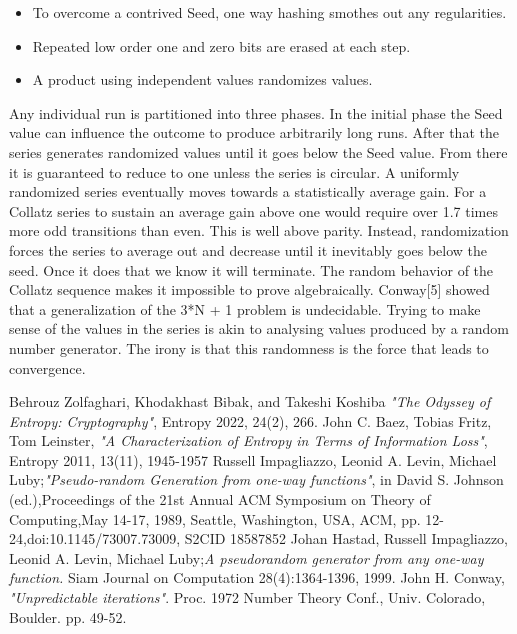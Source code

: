 \documentclass[letterpaper]{article}
\begin{document}
\begin{multicols}{2}
\begin{itemize}
    \item To overcome a contrived Seed, one way hashing smothes out any regularities.
    \item Repeated low order one and zero bits are erased at each step.
    \item A product using independent values randomizes values.
\end{itemize}
Any individual run is partitioned into three phases. In the initial phase the Seed value can influence the outcome to produce arbitrarily long runs. After that the series generates randomized values until it goes below the Seed value. From there it is guaranteed to reduce to one unless the series is circular.
A uniformly randomized series eventually moves towards a statistically average gain. For a Collatz series to sustain an average gain above one would require over 1.7 times more odd transitions than even. This is well above parity. Instead, randomization forces the series to average out and decrease until it inevitably goes below the seed. Once it does that we know it will terminate.
The random behavior of the Collatz sequence makes it impossible to prove algebraically. Conway[5] showed that a generalization of the 3*N + 1 problem is undecidable. Trying to make sense of the values in the series is akin to analysing values produced by a random number generator. The irony is that this randomness is the force that leads to convergence. 

\begin{thebibliography}{9}
Behrouz Zolfaghari, Khodakhast Bibak, and Takeshi Koshiba \emph{"The Odyssey of Entropy: Cryptography"}, Entropy 2022, 24(2), 266.%
John C. Baez, Tobias Fritz, Tom Leinster, \emph{"A Characterization of Entropy in Terms of Information Loss"}, Entropy 2011, 13(11), 1945-1957%
Russell Impagliazzo, Leonid A. Levin, Michael Luby;\emph{"Pseudo-random Generation from one-way functions"}, in David S. Johnson (ed.),Proceedings of the 21st Annual ACM Symposium on Theory of Computing,May 14-17, 1989, Seattle, Washington, USA, {ACM}, pp. 12-24,doi:10.1145/73007.73009, S2CID 18587852%
Johan Hastad, Russell Impagliazzo, Leonid A. Levin, Michael Luby;\emph{A pseudorandom generator from any one-way function.} Siam Journal on Computation 28(4):1364-1396, 1999.%
John H. Conway, \emph{"Unpredictable iterations"}. Proc. 1972 Number Theory Conf., Univ. Colorado, Boulder. pp. 49-52. 
\end{thebibliography}

\end{multicols}
\end{document}
